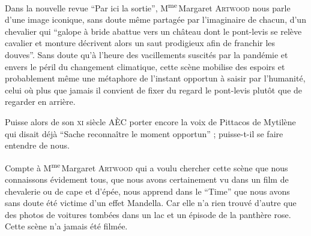 \begin{prose}
  Dans la nouvelle revue \enquote{Par ici la sortie}, M\textsuperscript{me}\,Margaret \textsc{Artwood} nous parle d’une image iconique, sans doute même partagée par l’imaginaire de chacun, d’un chevalier qui \enquote{galope à bride abattue vers un château dont le pont-levis se relève \textelp{} cavalier et monture décrivent alors un saut prodigieux afin de franchir les douves}. Sans doute qu’à l’heure des vacillements suscités par la pandémie et envers le péril du changement climatique, cette scène mobilise des espoirs et probablement même une métaphore de l’instant opportun à saisir par l’humanité, celui où plus que jamais il convient de fixer du regard le pont-levis plutôt que de regarder en arrière.

  Puisse alors de son \textsc{xi}\ieme{} siècle AÈC porter encore la voix de Pittacos de Mytilène qui disait déjà \enquote{Sache reconnaître le moment opportun} ; puisse-t-il se faire entendre de nous.

  Compte à M\textsuperscript{me}\,Margaret \textsc{Artwood} qui a voulu chercher cette scène que nous connaissons évidement tous, que nous avons certainement vu dans un film de chevalerie ou de cape et d’épée, nous apprend dans le \enquote{Time} que nous avons sans doute été victime d’un effet Mandella. Car elle n’a rien trouvé d’autre que des photos de voitures tombées dans un lac et un épisode de la panthère rose. Cette scène n’a jamais été filmée.
\end{prose}


